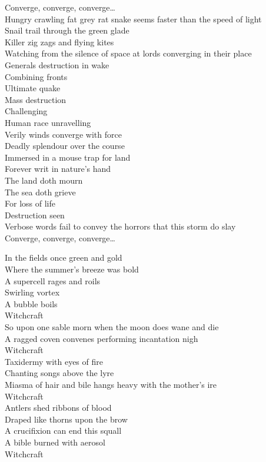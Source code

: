 Converge, converge, converge…\\

Hungry crawling fat grey rat snake seems faster than the speed of light\\
Snail trail through the green glade\\
Killer zig zags and flying kites\\
Watching from the silence of space at lords converging in their place\\
Generals destruction in wake\\
Combining fronts\\
Ultimate quake\\

Mass destruction\\
Challenging\\
Human race unravelling\\

Verily winds converge with force\\
Deadly splendour over the course\\
Immersed in a mouse trap for land\\
Forever writ in nature's hand\\
The land doth mourn\\
The sea doth grieve\\
For loss of life\\
Destruction seen\\
Verbose words fail to convey the horrors that this storm do slay\\

Converge, converge, converge…\\



In the fields once green and gold\\
Where the summer's breeze was bold\\
A supercell rages and roils\\
Swirling vortex\\
A bubble boils\\
Witchcraft\\
So upon one sable morn when the moon does wane and die\\
A ragged coven convenes performing incantation nigh\\
Witchcraft\\
Taxidermy with eyes of fire\\
Chanting songs above the lyre\\
Miasma of hair and bile hangs heavy with the mother's ire\\
Witchcraft\\
Antlers shed ribbons of blood\\
Draped like thorns upon the brow\\
A crucifixion can end this squall\\
A bible burned with aerosol\\
Witchcraft\\

